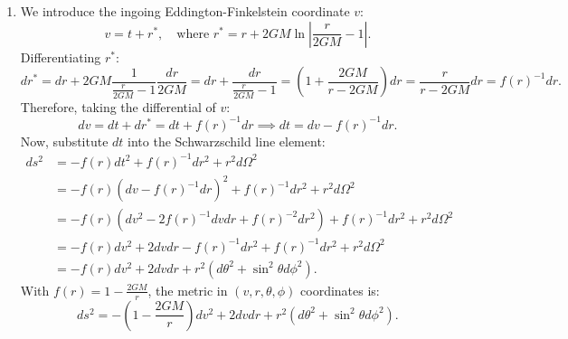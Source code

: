 \documentclass[12pt]{article}
\begin{document}
\begin{enumerate}[label=\alph*)]
\item We introduce the ingoing Eddington-Finkelstein coordinate $v$:
\begin{equation}
v = t + r^*, \quad \text{where } r^* = r + 2GM \ln\left|\frac{r}{2GM} - 1\right|.
\end{equation}
Differentiating $r^*$:
\begin{equation}
dr^* = dr + 2GM \frac{1}{\frac{r}{2GM} - 1} \frac{dr}{2GM} = dr + \frac{dr}{\frac{r}{2GM} - 1} = \left( 1 + \frac{2GM}{r - 2GM} \right) dr = \frac{r}{r - 2GM} dr = f(r)^{-1} dr.
\end{equation}
Therefore, taking the differential of $v$:
\begin{equation}
dv = dt + dr^* = dt + f(r)^{-1} dr \implies dt = dv - f(r)^{-1} dr.
\end{equation}
Now, substitute $dt$ into the Schwarzschild line element:
\begin{align}
ds^2 &= - f(r) dt^2 + f(r)^{-1} dr^2 + r^2 d\Omega^2 \nonumber \\
&= - f(r) \left( dv - f(r)^{-1} dr \right)^2 + f(r)^{-1} dr^2 + r^2 d\Omega^2 \nonumber \\
&= - f(r) \left( dv^2 - 2 f(r)^{-1} dv dr + f(r)^{-2} dr^2 \right) + f(r)^{-1} dr^2 + r^2 d\Omega^2 \nonumber \\
&= - f(r) dv^2 + 2 dv dr - f(r)^{-1} dr^2 + f(r)^{-1} dr^2 + r^2 d\Omega^2 \nonumber \\
&= - f(r) dv^2 + 2 dv dr + r^2 \left( d\theta^2 + \sin^2\theta d\phi^2 \right).
\end{align}
With $f(r) = 1 - \frac{2GM}{r}$, the metric in $(v,r,\theta,\phi)$ coordinates is:
\begin{equation}
ds^2 = - \left( 1 - \frac{2GM}{r} \right) dv^2 + 2 dv dr + r^2 \left( d\theta^2 + \sin^2\theta d\phi^2 \right).
\end{equation}


\end{enumerate}
\end{document}
